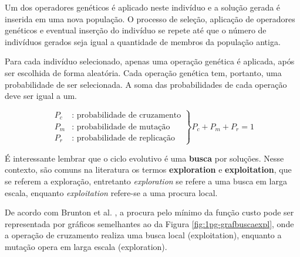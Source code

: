 Um dos operadores genéticos é aplicado neste indivíduo e a solução gerada é inserida em uma nova população. O processo de seleção, aplicação de operadores genéticos e eventual inserção do indivíduo se repete até que o número de indivíduos gerados seja igual a quantidade de membros da população antiga.

Para cada indivíduo selecionado, apenas uma operação genética é aplicada, após ser escolhida de forma aleatória. Cada operação genética tem, portanto, uma probabilidade de ser selecionada. A soma das probabilidades de cada operação deve ser igual a um.


\begin{equation}
\left.\begin{aligned}
P_c&\text{: probabilidade de cruzamento} \\
P_m&\text{: probabilidade de mutação} \\
P_r&\text{: probabilidade de replicação}
\end{aligned}\right\} P_c+P_m+P_r=1
\end{equation}

É interessante lembrar que o ciclo evolutivo é uma \textbf{busca} por soluções. Nesse contexto, são comuns na literatura os termos \textbf{exploration} e \textbf{exploitation}, que se referem a exploração, entretanto \textit{exploration} se refere a uma busca em larga escala, enquanto \textit{exploitation} refere-se a uma procura local.

De acordo com Brunton et al. \cite{duriez17bookMlc}, a procura pelo mínimo da função custo pode ser representada por gráficos semelhantes ao da Figura \ref{fig:1pg-grafbuscaexpl}, onde a operação de cruzamento realiza uma busca local (exploitation), enquanto a mutação opera em larga escala (exploration).


